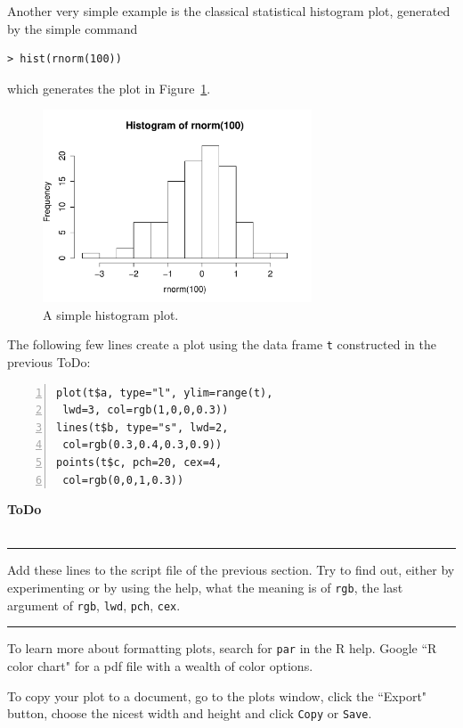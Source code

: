 \documentclass[a4paper,11pt,twocolumn,tablecaptionabove]{scrartcl} %
\newenvironment{ToDo} {%
  \begin{flushright}
    \hfill
    \begin{minipage}{0.95\columnwidth}         %
    \textsf{\textbf{ToDo}} \\
      \vspace{-0.85cm}\\
      {\color{Gray}\rule[-0.1cm]{\columnwidth}{1.5pt}}} { %
      {\color{Gray} \rule[0.3cm]{\columnwidth}{1.5pt}}
    \end{minipage}
    \vspace{1em}
  \end{flushright}
  }
\begin{document}
Another very simple example is the classical statistical histogram plot, generated by the
simple command
\begin{Verbatim}[frame=single,gobble=0]
  > hist(rnorm(100))
\end{Verbatim}
which generates the plot in Figure~\ref{fig:hist}.
\begin{figure}[h]
  \centering
  \includegraphics[width=8cm]{img/hist.pdf}
  \caption{A simple histogram plot.}
  \label{fig:hist}
\end{figure}

\noindent The following few lines create a plot using the data frame \texttt{t}
constructed in the previous ToDo:
\begin{Verbatim}[frame=single,numbers=left,gobble=0, xleftmargin=0.35cm, numbersep=0.1cm]
plot(t$a, type="l", ylim=range(t), 
 lwd=3, col=rgb(1,0,0,0.3))
lines(t$b, type="s", lwd=2, 
 col=rgb(0.3,0.4,0.3,0.9))
points(t$c, pch=20, cex=4, 
 col=rgb(0,0,1,0.3))
\end{Verbatim} 

\begin{ToDo}
  Add these lines to the script file of the previous section. Try to
  find out, either by experimenting or by using the help, what the
  meaning is of \texttt{rgb}, the last argument of \texttt{rgb},
  \texttt{lwd}, \texttt{pch}, \texttt{cex}.\\
\end{ToDo}

To learn more about formatting plots, search for \texttt{par} in the R help. 
Google ``R color chart" for a pdf file with a wealth of color options.

To copy your plot to a document, go to the plots window, click the ``Export" button, choose the nicest width and height and click \texttt{Copy} or \texttt{Save}. 


\end{document}
